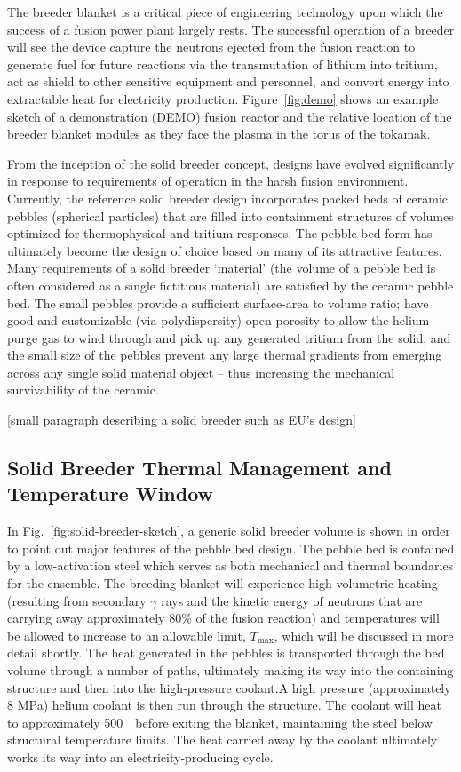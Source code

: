 The breeder blanket is a critical piece of engineering technology upon which the success of a fusion power plant largely rests. The successful operation of a breeder will see the device capture the neutrons ejected from the fusion reaction to generate fuel for future reactions via the transmutation of lithium into tritium, act as shield to other sensitive equipment and personnel, and convert energy into extractable heat for electricity production. Figure~\ref{fig:demo} shows an example sketch of a demonstration (DEMO) fusion reactor and the relative location of the breeder blanket modules as they face the plasma in the torus of the tokamak. 



From the inception of the solid breeder concept, designs have evolved significantly in response to requirements of operation in the harsh fusion environment. Currently, the reference solid breeder design incorporates packed beds of ceramic pebbles (spherical particles) that are filled into containment structures of volumes optimized for thermophysical and tritium responses. The pebble bed form has ultimately become the design of choice based on many of its attractive features. Many requirements of a solid breeder `material' (the volume of a pebble bed is often considered as a single fictitious material) are satisfied by the ceramic pebble bed. The small pebbles provide a sufficient surface-area to volume ratio; have good and customizable (via polydispersity) open-porosity to allow the helium purge gas to wind through and pick up any generated tritium from the solid; and the small size of the pebbles prevent any large thermal gradients from emerging across any single solid material object -- thus increasing the mechanical survivability of the ceramic. 

[small paragraph describing a solid breeder such as EU's design]

\subsection{Solid Breeder Thermal Management and Temperature Window}
In Fig.~\ref{fig:solid-breeder-sketch}, a generic solid breeder volume is shown in order to point out major features of the pebble bed design. The pebble bed is contained by a low-activation steel which serves as both mechanical and thermal boundaries for the ensemble. The breeding blanket will experience high volumetric heating (resulting from secondary $\gamma$ rays and the kinetic energy of neutrons that are carrying away approximately 80\% of the fusion reaction) and temperatures will be allowed to increase to an allowable limit, $T_\mathrm{max}$, which will be discussed in more detail shortly. The heat generated in the pebbles is transported through the bed volume through a number of paths, ultimately making its way into the containing structure and then into the high-pressure coolant.A high pressure (approximately 8 MPa) helium coolant is then run through the structure. The coolant will heat to approximately 500~\celsius~before exiting the blanket, maintaining the steel below structural temperature limits. The heat carried away by the coolant ultimately works its way into an electricity-producing cycle. 

